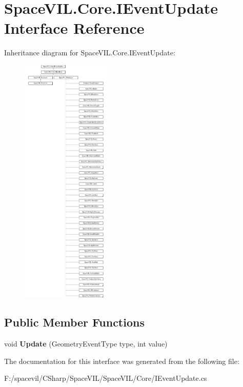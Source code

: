 \hypertarget{interface_space_v_i_l_1_1_core_1_1_i_event_update}{}\section{Space\+V\+I\+L.\+Core.\+I\+Event\+Update Interface Reference}
\label{interface_space_v_i_l_1_1_core_1_1_i_event_update}
Inheritance diagram for Space\+V\+I\+L.\+Core.\+I\+Event\+Update\+:\begin{figure}[H]
\begin{center}
\leavevmode
\includegraphics[height=12.000000cm]{interface_space_v_i_l_1_1_core_1_1_i_event_update}
\end{center}
\end{figure}
\subsection*{Public Member Functions}
\begin{DoxyCompactItemize}
\item 
\mbox{\label{interface_space_v_i_l_1_1_core_1_1_i_event_update_a7cef5587515d1c89297cd2848ea6ac65}} 
void {\bfseries Update} (Geometry\+Event\+Type type, int value)
\end{DoxyCompactItemize}


The documentation for this interface was generated from the following file\+:\begin{DoxyCompactItemize}
\item 
F\+:/spacevil/\+C\+Sharp/\+Space\+V\+I\+L/\+Space\+V\+I\+L/\+Core/I\+Event\+Update.\+cs\end{DoxyCompactItemize}
